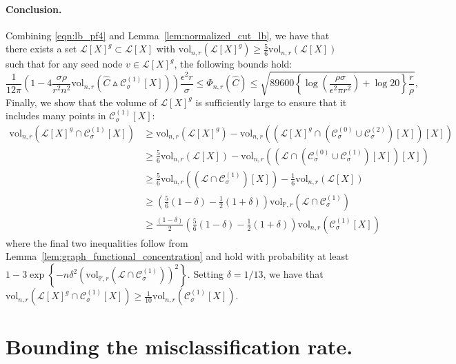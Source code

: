 \documentclass[11pt,twoside]{article}
\newcommand{\set}[1]{\left\{#1\right\}}
\newcommand{\vol}{\mathrm{vol}}
\newcommand{\1}{\mathbf{1}}
\newcommand{\Xbf}{X}             %
\newcommand{\Pbb}{\mathbb{P}}
\newcommand{\Cset}{\mathcal{C}}
\newcommand{\Csig}{\Cset_{\sigma}}
\begin{document}
\paragraph{Conclusion.}
Combining \eqref{eqn:lb_pf4} and Lemma~\ref{lem:normalized_cut_lb}, we have that there exists a set $\mathcal{L}[\Xbf]^g \subset \mathcal{L}[\Xbf]$ with $\vol_{n,r}(\mathcal{L}[\Xbf]^g) \geq \frac{5}{6}\vol_{n,r}(\mathcal{L}[\Xbf])$ such that for any seed node $v \in \mathcal{L}[\Xbf]^g$, the following bounds hold:
\begin{equation*}
\frac{1}{12\pi} \left(1 - 4\frac{\sigma \rho}{r^2 n^2} \vol_{n,r}(\widehat{C} \vartriangle \mathcal{C}_{\sigma}^{(1)}[\Xbf]) \right) \frac{\epsilon^2 r}{\sigma} \leq \Phi_{n,r}(\widehat{C}) \leq \sqrt{89600\left\{\log\left(\frac{\rho \sigma}{\epsilon^2 \pi r^2}\right) + \log 20\right\} \frac{r}{\rho}},
\end{equation*}
Finally, we show that the volume of $\mathcal{L}[\Xbf]^g$ is sufficiently large to ensure that it includes many points in $\mathcal{C}_{\sigma}^{(1)}[\Xbf]$:
\begin{align*}
\vol_{n,r}(\mathcal{L}[\Xbf]^g \cap \mathcal{C}_{\sigma}^{(1)}[\Xbf]) & \geq  \vol_{n,r}(\mathcal{L}[\Xbf]^g) - \vol_{n,r}((\mathcal{L}[\Xbf]^g \cap (\mathcal{C}_{\sigma}^{(0)} \cup \mathcal{C}_{\sigma}^{(2)})[\Xbf])[\Xbf]) \\
& \geq \frac{5}{6}\vol_{n,r}(\mathcal{L}[\Xbf]) - \vol_{n,r}((\mathcal{L} \cap (\mathcal{C}_{\sigma}^{(0)} \cup \mathcal{C}_{\sigma}^{(1)})[\Xbf])[\Xbf]) \\
& \geq \frac{5}{6}\vol_{n,r}((\mathcal{L} \cap \mathcal{C}_{\sigma}^{(1)})[\Xbf]) - \frac{1}{6}\vol_{n,r}(\mathcal{L}[\Xbf]) \\
& \geq \left(\frac{5}{6}(1 - \delta) - \frac{1}{2}(1 + \delta)\right)\vol_{\Pbb,r}( \mathcal{L} \cap \Csig^{(1)}) \\
& \geq \frac{(1 - \delta)}{2}\left(\frac{5}{6}(1 - \delta) - \frac{1}{2}(1 + \delta)\right)\vol_{n,r}(\mathcal{C}_{\sigma}^{(1)}[\Xbf])
\end{align*}
where the final two inequalities follow from Lemma~\ref{lem:graph_functional_concentration} and hold with probability at least $1 - 3\exp\set{-n\delta^2(\vol_{\Pbb,r}( \mathcal{L} \cap \Csig^{(1)}))^2}$. Setting $\delta = 1/13$, we have that $\vol_{n,r}(\mathcal{L}[\Xbf]^g \cap \mathcal{C}_{\sigma}^{(1)}[\Xbf]) \geq \frac{1}{10}\vol_{n,r}(\mathcal{C}_{\sigma}^{(1)}[\Xbf])$.

\section{Bounding the misclassification rate.}
\label{sec: proof_of_misclassification_rate}
\end{document}

